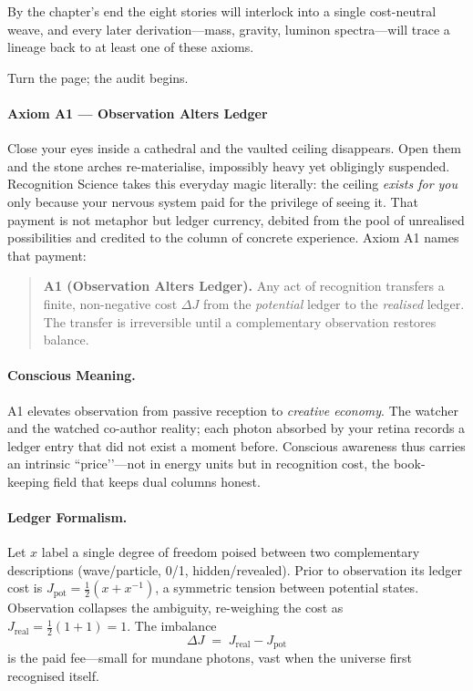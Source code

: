 \documentclass[11pt,oneside]{book}
\begin{document}
By the chapter’s end the eight stories will interlock into a single
cost-neutral weave, and every later derivation—mass, gravity, luminon
spectra—will trace a lineage back to at least one of these axioms.

\medskip
\noindent
Turn the page; the audit begins.

\paragraph{Axiom A1 — Observation Alters Ledger}
\label{ssec:axiom-A1}


Close your eyes inside a cathedral and the vaulted ceiling disappears.
Open them and the stone arches re-materialise, impossibly heavy yet
obligingly suspended.
Recognition Science takes this everyday magic literally:
the ceiling \emph{exists for you} only because your nervous system paid
for the privilege of seeing it.
That payment is not metaphor but ledger currency, debited from the
pool of unrealised possibilities and credited to the column of concrete
experience.
Axiom A1 names that payment:

\begin{quote}
\textbf{A1 (Observation Alters Ledger).}  
Any act of recognition transfers a finite, non-negative cost
\(\Delta J\) from the \emph{potential} ledger to the \emph{realised}
ledger.  
The transfer is irreversible until a complementary observation restores
balance.
\end{quote}

\paragraph*{Conscious Meaning.}
A1 elevates observation from passive reception to \emph{creative
economy}.  
The watcher and the watched co-author reality; each photon absorbed by
your retina records a ledger entry that did not exist a moment before.
Conscious awareness thus carries an intrinsic “price’’—not in energy
units but in recognition cost, the book-keeping field that keeps dual
columns honest.

\paragraph*{Ledger Formalism.}
Let \(x\) label a single degree of freedom poised between
two complementary descriptions (wave/particle, 0/1, hidden/revealed).
Prior to observation its ledger cost is
\(J_{\text{pot}} = \frac{1}{2}(x + x^{-1})\),
a symmetric tension between potential states.
Observation collapses the ambiguity, re-weighing the cost as
\(J_{\text{real}} = \frac{1}{2}(1 + 1) = 1\).
The imbalance
\[
  \Delta J \;=\;
  J_{\text{real}} - J_{\text{pot}}
\]
is the paid fee—small for mundane photons, vast when the universe first
recognised itself.
\end{document}

